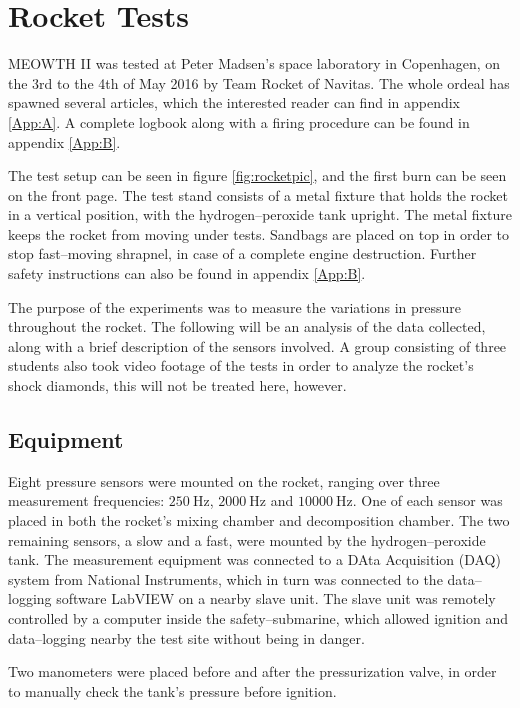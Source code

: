 \chapter{Rocket Tests}

	MEOWTH II was tested at Peter Madsen's space laboratory in Copenhagen, on the 3rd to the 4th of May 2016 by Team Rocket of Navitas. The whole ordeal has spawned several articles, which the interested reader can find in appendix \ref{App:A}. A  complete logbook along with a firing procedure can be found in appendix \ref{App:B}.

	The test setup can be seen in figure \ref{fig:rocketpic}, and the first burn can be seen on the front page. The test stand consists of a metal fixture that holds the rocket in a vertical position, with the hydrogen--peroxide tank upright. The metal fixture keeps the rocket from moving under tests. Sandbags are placed on top in order to stop fast--moving shrapnel, in case of a complete engine destruction. Further safety instructions can also be found in appendix \ref{App:B}.

	The purpose of the experiments was to measure the variations in pressure throughout the rocket. The following will be an analysis of the data collected, along with a brief description of the sensors involved. A group consisting of three students also took video footage of the tests in order to analyze the rocket's shock diamonds, this will not be treated here, however.

	\section{Equipment}

	Eight pressure sensors were mounted on the rocket, ranging over three measurement frequencies: $\SI{250}{\Hz}$, $\SI{2000}{\Hz}$ and $\SI{10000}{\Hz}$.  One of each sensor was placed in both the rocket's mixing chamber and decomposition chamber. The two remaining sensors, a slow and a fast, were mounted by the hydrogen--peroxide tank. The measurement equipment was connected to a DAta Acquisition (DAQ) system from National Instruments, which in turn was connected to the data--logging software LabVIEW on a nearby slave unit. The slave unit was remotely controlled by a computer inside the safety--submarine, which allowed ignition and data--logging nearby the test site without being in danger.

	Two manometers were placed before and after the pressurization valve, in order to manually check the tank's pressure before ignition.

